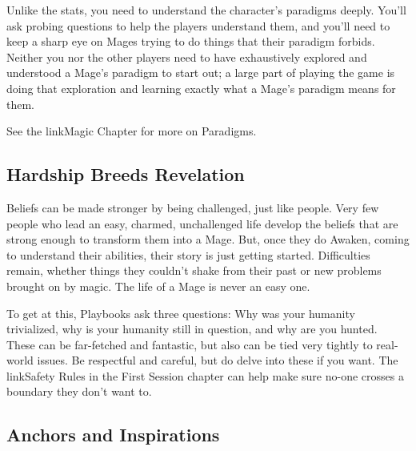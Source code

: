 \documentclass[
  oneside,
  statementpaper,
  9pt]{memoir}
\begin{document}
\begin{MC}

Unlike the stats, you need to understand the character's paradigms deeply. You'll ask probing questions to help the players understand them, and you'll need to keep a sharp eye on Mages trying to do things that their paradigm forbids. Neither you nor the other players need to have exhaustively explored and understood a Mage's paradigm to start out; a large part of playing the game is doing that exploration and learning exactly what a Mage's paradigm means for them.

See the {{linkMagic Chapter}} for more on Paradigms.

\end{MC}

\hypertarget{hardship-breeds-revelation}{%
\subsection{Hardship Breeds
Revelation}\label{hardship-breeds-revelation}}

\begin{Narrator}

Beliefs can be made stronger by being challenged, just like people. Very few people who lead an easy, charmed, unchallenged life develop the beliefs that are strong enough to transform them into a Mage. But, once they do Awaken, coming to understand their abilities, their story is just getting started. Difficulties remain, whether things they couldn’t shake from their past or new problems brought on by magic. The life of a Mage is never an easy one.

To get at this, Playbooks ask three questions: Why was your humanity trivialized, why is your humanity still in question, and why are you hunted. These can be far-fetched and fantastic, but also can be tied very tightly to real-world issues. Be respectful and careful, but do delve into these if you want. The {{linkSafety Rules}} in the First Session chapter can help make sure no-one crosses a boundary they don’t want to.

\end{Narrator}

\hypertarget{anchors-and-inspirations}{%
\subsection{Anchors and Inspirations}\label{anchors-and-inspirations}}
\end{document}
